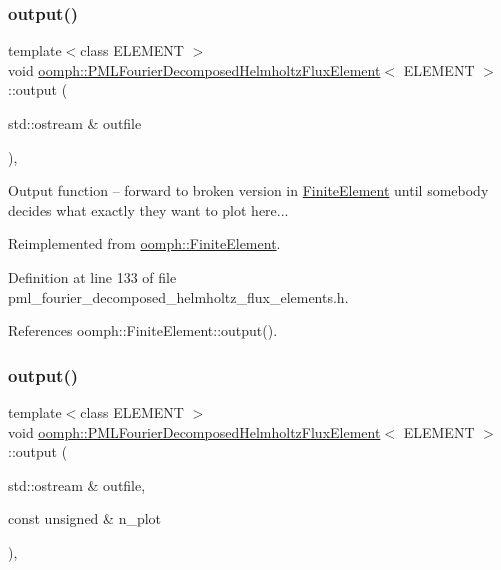 \subsubsection{\texorpdfstring{output()}{output()}\hspace{0.1cm}{\footnotesize\ttfamily [1/4]}}
{\footnotesize\ttfamily template$<$class E\+L\+E\+M\+E\+NT $>$ \\
void \hyperlink{classoomph_1_1PMLFourierDecomposedHelmholtzFluxElement}{oomph\+::\+P\+M\+L\+Fourier\+Decomposed\+Helmholtz\+Flux\+Element}$<$ E\+L\+E\+M\+E\+NT $>$\+::output (\begin{DoxyParamCaption}\item[{std\+::ostream \&}]{outfile }\end{DoxyParamCaption})\hspace{0.3cm}{\ttfamily [inline]}, {\ttfamily [virtual]}}

Output function -- forward to broken version in \hyperlink{classoomph_1_1FiniteElement}{Finite\+Element} until somebody decides what exactly they want to plot here... 

Reimplemented from \hyperlink{classoomph_1_1FiniteElement_a2ad98a3d2ef4999f1bef62c0ff13f2a7}{oomph\+::\+Finite\+Element}.



Definition at line 133 of file pml\+\_\+fourier\+\_\+decomposed\+\_\+helmholtz\+\_\+flux\+\_\+elements.\+h.



References oomph\+::\+Finite\+Element\+::output().

\mbox{\label{classoomph_1_1PMLFourierDecomposedHelmholtzFluxElement_afc5b763269729cdd6a6080dfcca81c86}} 
\subsubsection{\texorpdfstring{output()}{output()}\hspace{0.1cm}{\footnotesize\ttfamily [2/4]}}
{\footnotesize\ttfamily template$<$class E\+L\+E\+M\+E\+NT $>$ \\
void \hyperlink{classoomph_1_1PMLFourierDecomposedHelmholtzFluxElement}{oomph\+::\+P\+M\+L\+Fourier\+Decomposed\+Helmholtz\+Flux\+Element}$<$ E\+L\+E\+M\+E\+NT $>$\+::output (\begin{DoxyParamCaption}\item[{std\+::ostream \&}]{outfile,  }\item[{const unsigned \&}]{n\+\_\+plot }\end{DoxyParamCaption})\hspace{0.3cm}{\ttfamily [inline]}, {\ttfamily [virtual]}}




